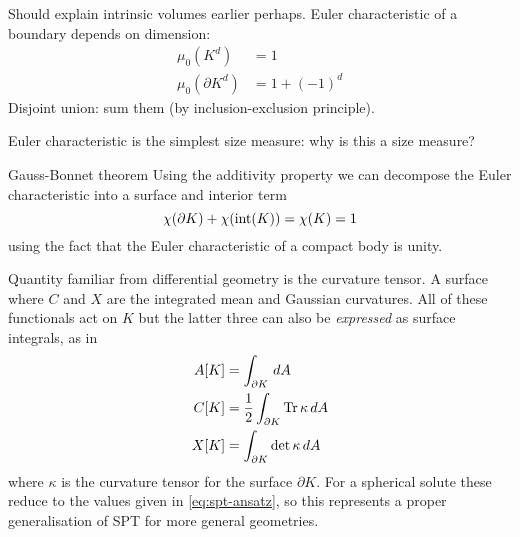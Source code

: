 Should explain intrinsic volumes earlier perhaps.
Euler characteristic of a boundary depends on dimension:
\begin{align}
  \mu_0(K^d) &= 1 \\
  \mu_0(\partial K^d) &= 1 + (-1)^d
\end{align}
Disjoint union: sum them (by inclusion-exclusion principle).

Euler characteristic is the simplest size measure: why is this a size measure?

\begin{theorem}{Gauss-Bonnet theorem}
  Using the additivity property we can decompose the Euler characteristic into a surface and interior term
  \begin{equation*}
    \chi(\partial K) + \chi( \operatorname{int}(K) ) = \chi(K) = 1
  \end{equation*}
  using the fact that the Euler characteristic of a compact body is unity.
\end{theorem}

Quantity familiar from differential geometry is the curvature tensor.
A surface
where $C$ and $X$ are the integrated mean and Gaussian curvatures.
All of these functionals act on $K$ but the latter three can also be \emph{expressed} as surface integrals, as in
\begin{subequations}
  \begin{align}
    A[K]
    &=
    \int_{\partial K} \, dA
    \\
    C[K]
    &=
    \frac{1}{2} \int_{\partial K} \operatorname*{Tr}{\kappa} \, dA
    \\
    X[K]
    &=
    \int_{\partial K} \det{\kappa} \, dA
  \end{align}
\end{subequations}
where $\kappa$ is the curvature tensor for the surface $\partial K$.
For a spherical solute these reduce to the values given in \eqref{eq:spt-ansatz}, so this represents a proper generalisation of SPT for more general geometries.

